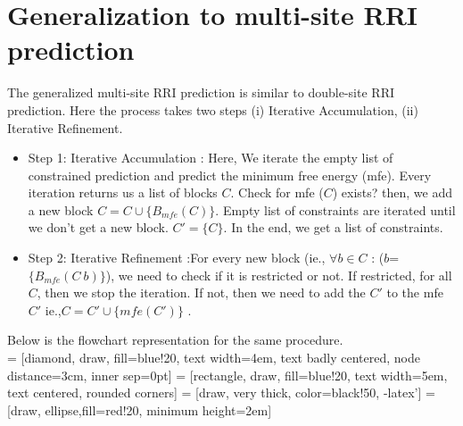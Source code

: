 \documentclass[twoside,a4paper]{report}
\numberwithin{equation}{section}
\begin{document}
	\section{Generalization to multi-site RRI prediction}
	
	The generalized multi-site RRI prediction is similar to double-site RRI prediction. Here the process takes two steps (i) Iterative Accumulation, (ii) Iterative Refinement.\\
	 \begin{itemize}
	
	\item Step 1: Iterative Accumulation : Here, We iterate the empty list of constrained prediction and predict the minimum free energy (mfe). Every iteration returns us a list of blocks $C$. Check for mfe ($C$) exists? then, we add a new block $C=C \cup \{B_{mfe}(C)\}$. Empty list of constraints are iterated until we don't get a new block. $C' = \{C\}$. In the end, we get a list of constraints.
	\item Step 2: Iterative Refinement :For every new block (ie., $\forall b \in C$ : ($b$= $\{B_{mfe}(C \ {b})\}$), we need to check if it is restricted or not. If restricted, for all $C$, then we stop the iteration. If not, then we need to add the $C'$ to the mfe $C'$ ie.,$C=C' \cup \{mfe (C')\}$ .
	
\end{itemize}

Below is the flowchart representation for the same procedure.\\

 = [diamond, draw, fill=blue!20, 
text width=4em, text badly centered, node distance=3cm, inner sep=0pt]
 = [rectangle, draw, fill=blue!20, 
text width=5em, text centered, rounded corners]
 = [draw, very thick, color=black!50, -latex']
 = [draw, ellipse,fill=red!20,
minimum height=2em]
\end{document}
